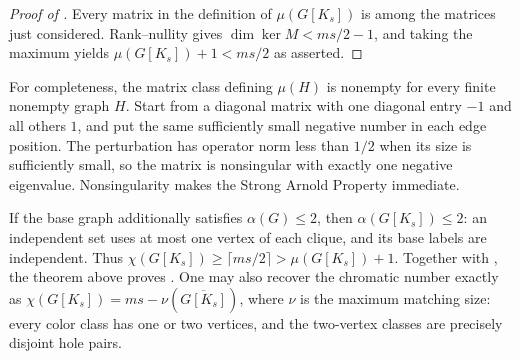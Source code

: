 \begin{proof}[Proof of ]
Every matrix in the definition of $\mu(G[K_s])$ is among the matrices
just considered.  Rank--nullity gives
$\dim\ker M<ms/2-1$, and taking the maximum yields
$\mu(G[K_s])+1<ms/2$ as asserted.
\end{proof}

For completeness, the matrix class defining $\mu(H)$ is nonempty for
every finite nonempty graph $H$.  Start from a diagonal matrix with one diagonal
entry $-1$ and all others $1$, and put the same sufficiently small
negative number in each edge position.  The perturbation has operator
norm less than $1/2$ when its size is sufficiently small, so the matrix
is nonsingular with exactly one negative eigenvalue.  Nonsingularity
makes the Strong Arnold Property immediate.

If the base graph additionally satisfies $\alpha(G)\le2$, then
$\alpha(G[K_s])\le2$: an independent set uses at most one vertex of
each clique, and its base labels are independent.  Thus
$\chi(G[K_s])\ge\lceil ms/2\rceil>\mu(G[K_s])+1$.  Together with
, the theorem above proves .
One may also recover the chromatic number exactly as
$\chi(G[K_s])=ms-\nu(\overline{G[K_s]})$, where $\nu$ is the maximum
matching size: every color class has one or two vertices, and the
two-vertex classes are precisely disjoint hole pairs.

